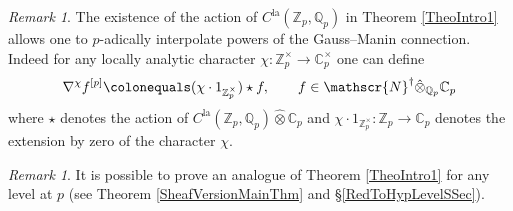 \documentclass[10pt, oneside]{amsart}
\newcommand{\defeq}{\colonequals}
\numberwithin{equation}{subsection}
\theoremstyle{definition}
\theoremstyle{remark}
\newtheorem{remark}[equation]{Remark}
\newcommand{\mbb}[1]{\mathbb{#1}}
\newcommand{\hatot}{\hat{\otimes}}
\newcommand{\opn}[1]{\operatorname{#1}}
\begin{document}
\begin{remark}
The existence of the action of $C^{\opn{la}}(\mbb{Z}_p, \mbb{Q}_p)$ in Theorem \ref{TheoIntro1} allows one to $p$-adically interpolate powers of the Gauss--Manin connection. Indeed for any locally analytic character $\chi \colon \mbb{Z}_p^{\times} \to \mbb{C}_p^{\times}$ one can define 
\[
\nabla^{\chi} f^{[p]} \defeq (\chi \cdot 1_{\mbb{Z}_p^{\times}} ) \star f, \quad \quad f \in \mathscr{N}^{\dagger} \hatot_{\mbb{Q}_p} \mbb{C}_p
\]
where $\star$ denotes the action of $C^{\opn{la}}(\mbb{Z}_p, \mbb{Q}_p) \hatot \mbb{C}_p$ and $\chi \cdot 1_{\mbb{Z}_p^{\times}} \colon \mbb{Z}_p \to \mbb{C}_p$ denotes the extension by zero of the character $\chi$.
\end{remark}

\begin{remark}
It is possible to prove an analogue of Theorem \ref{TheoIntro1} for any level at $p$ (see Theorem \ref{SheafVersionMainThm} and \S \ref{RedToHypLevelSSec}). 
\end{remark}
\end{document}

